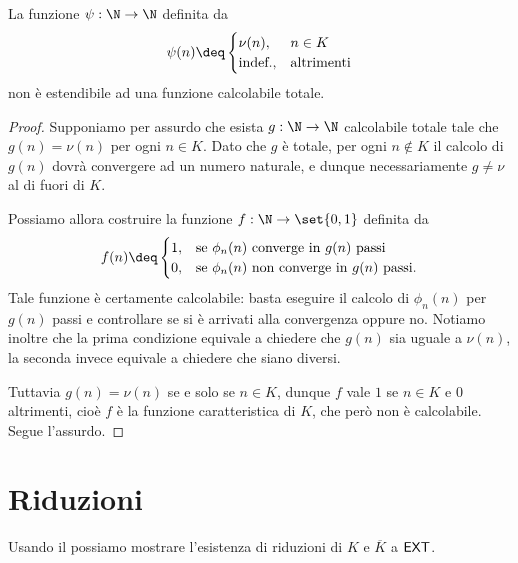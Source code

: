 \documentclass[
    a4paper,
    language=italian,
    oneside,
    10pt,
    article,
    thmstyle=professional
]{notes}
\renewcommand{\compl}[1]{\overline{#1}}
\newcommand{\EXT}{\normalfont\textsf{EXT}}
\newcommand{\indef}{\text{indef.}}
\newcommand{\altr}{\text{altrimenti}}
\begin{document}
    \begin{lemma}[label=lem:not-ext]
        La funzione $\psi : \N \to \N$ definita da \[
            \psi(n) \deq \begin{cases}
                \nu(n), &n \in K\\
                \indef, &\altr
            \end{cases}
        \] non è estendibile ad una funzione calcolabile totale.
    \end{lemma}
    \begin{proof}
        Supponiamo per assurdo che esista $g : \N \to \N$ calcolabile
        totale tale che $g(n) = \nu(n)$ per ogni $n \in K$.
        Dato che $g$ è totale, per ogni $n \notin K$ 
        il calcolo di $g(n)$ dovrà convergere ad un numero naturale,
        e dunque necessariamente $g \neq \nu$ al di fuori di $K$.   
        
        Possiamo allora costruire la funzione $f : \N \to \set{0,1}$
        definita da \begin{align*}
            f(n) 
            \deq \begin{cases}
                1, &\text{se $\phi_n(n)$ converge in $g(n)$ passi}\\
                0, &\text{se $\phi_n(n)$ non converge in $g(n)$ passi}.
            \end{cases}
        \end{align*}
        Tale funzione è certamente calcolabile: basta eseguire il calcolo
        di $\phi_n(n)$ per $g(n)$ passi e controllare se si è arrivati
        alla convergenza oppure no.
        Notiamo inoltre che la prima condizione equivale a chiedere 
        che $g(n)$ sia uguale a $\nu(n)$, 
        la seconda invece equivale a chiedere che siano diversi.
        
        Tuttavia $g(n) = \nu(n)$ se e solo se $n \in K$, dunque $f$ vale
        $1$ se $n \in K$ e $0$ altrimenti, cioè $f$ è la funzione caratteristica di $K$, che però non è calcolabile. Segue l'assurdo.
    \end{proof}

    \section{Riduzioni}
    Usando il  possiamo mostrare l'esistenza di riduzioni
    di $K$ e $\compl{K}$ a $\EXT$.
    
\end{document}
